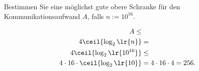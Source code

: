 \begin{myexercise}
	Bestimmen Sie eine möglichst gute obere Schranke für den Kommunikationsaufwand $A$, falls $n:=10^{16}$.
	\begin{myanswer}
		\begin{align*}
			A \leq                             &                           \\
			4\ceil{\log_2\lr{n}}               & =                         \\
			4\ceil{\log_2\lr{10^{16}}}         & \leq                      \\
			4\cdot 16\cdot\ceil{\log_2\lr{10}} & = 4\cdot 16\cdot 4 = 256.
		\end{align*}
	\end{myanswer}
\end{myexercise}

